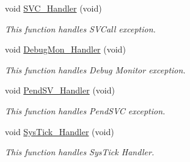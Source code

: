 \begin{DoxyCompactItemize}
void \hyperlink{group___a_d_c___interleaved___d_m_amode2_ga3e5ddb3df0d62f2dc357e64a3f04a6ce}{S\-V\-C\-\_\-\-Handler} (void)
\begin{DoxyCompactList}\small\item\em This function handles S\-V\-Call exception. \end{DoxyCompactList}\item 
void \hyperlink{group___a_d_c___interleaved___d_m_amode2_gadbdfb05858cc36fc520974df37ec3cb0}{Debug\-Mon\-\_\-\-Handler} (void)
\begin{DoxyCompactList}\small\item\em This function handles Debug Monitor exception. \end{DoxyCompactList}\item 
void \hyperlink{group___a_d_c___interleaved___d_m_amode2_ga6303e1f258cbdc1f970ce579cc015623}{Pend\-S\-V\-\_\-\-Handler} (void)
\begin{DoxyCompactList}\small\item\em This function handles Pend\-S\-V\-C exception. \end{DoxyCompactList}\item 
void \hyperlink{group___a_d_c___interleaved___d_m_amode2_gab5e09814056d617c521549e542639b7e}{Sys\-Tick\-\_\-\-Handler} (void)
\begin{DoxyCompactList}\small\item\em This function handles Sys\-Tick Handler. \end{DoxyCompactList}\end{DoxyCompactItemize}
